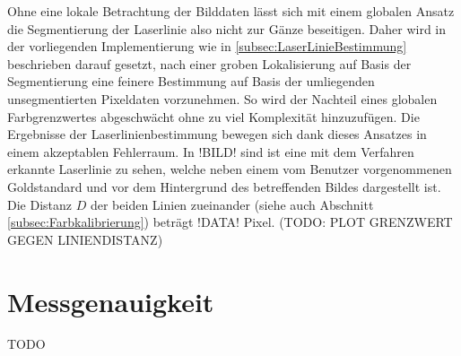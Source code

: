 Ohne eine lokale Betrachtung der Bilddaten lässt sich mit einem globalen Ansatz die Segmentierung der Laserlinie also nicht zur  Gänze beseitigen. Daher wird in der vorliegenden Implementierung wie in \ref{subsec:LaserLinieBestimmung} beschrieben darauf gesetzt, nach einer groben Lokalisierung auf Basis der Segmentierung eine feinere Bestimmung auf Basis der umliegenden unsegmentierten Pixeldaten vorzunehmen. So wird der Nachteil eines globalen Farbgrenzwertes abgeschwächt ohne zu viel Komplexität hinzuzufügen. Die Ergebnisse der Laserlinienbestimmung bewegen sich dank dieses Ansatzes in einem akzeptablen Fehlerraum. In !BILD! sind ist eine mit dem Verfahren erkannte Laserlinie zu sehen, welche neben einem vom Benutzer vorgenommenen Goldstandard und vor dem Hintergrund des betreffenden Bildes dargestellt ist. Die Distanz \(D\) der beiden Linien zueinander (siehe auch Abschnitt \ref{subsec:Farbkalibrierung}) beträgt !DATA! Pixel.
(TODO: PLOT GRENZWERT GEGEN LINIENDISTANZ)

\section{Messgenauigkeit}
TODO